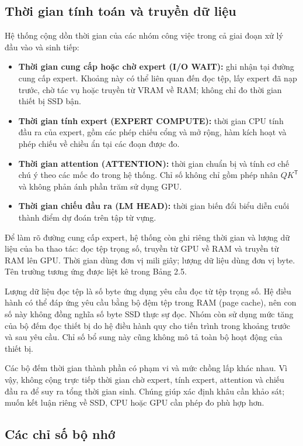 \subsection{Thời gian tính toán và truyền dữ liệu}

Hệ thống cộng dồn thời gian của các nhóm công việc trong cả giai đoạn xử lý đầu vào và sinh tiếp:

\begin{itemize}
\item \textbf{Thời gian cung cấp hoặc chờ expert (I/O WAIT):} ghi nhận tại đường cung cấp expert. Khoảng này có thể liên quan đến đọc tệp, lấy expert đã nạp trước, chờ tác vụ hoặc truyền từ VRAM về RAM; không chỉ đo thời gian thiết bị SSD bận.
\item \textbf{Thời gian tính expert (EXPERT COMPUTE):} thời gian CPU tính đầu ra của expert, gồm các phép chiếu cổng và mở rộng, hàm kích hoạt và phép chiếu về chiều ẩn tại các đoạn được đo.
\item \textbf{Thời gian attention (ATTENTION):} thời gian chuẩn bị và tính cơ chế chú ý theo các mốc đo trong hệ thống. Chỉ số không chỉ gồm phép nhân $QK^\mathsf{T}$ và không phản ánh phần trăm sử dụng GPU.
\item \textbf{Thời gian chiếu đầu ra (LM HEAD):} thời gian biến đổi biểu diễn cuối thành điểm dự đoán trên tập từ vựng.
\end{itemize}

Để làm rõ đường cung cấp expert, hệ thống còn ghi riêng thời gian và lượng dữ liệu của ba thao tác: đọc tệp trọng số, truyền từ GPU về RAM và truyền từ RAM lên GPU. Thời gian dùng đơn vị mili giây; lượng dữ liệu dùng đơn vị byte. Tên trường tương ứng được liệt kê trong Bảng 2.5.

Lượng dữ liệu đọc tệp là số byte ứng dụng yêu cầu đọc từ tệp trọng số. Hệ điều hành có thể đáp ứng yêu cầu bằng bộ đệm tệp trong RAM (page cache), nên con số này không đồng nghĩa số byte SSD thực sự đọc. Nhóm còn sử dụng mức tăng của bộ đếm đọc thiết bị do hệ điều hành quy cho tiến trình trong khoảng trước và sau yêu cầu. Chỉ số bổ sung này cũng không mô tả toàn bộ hoạt động của thiết bị.

Các bộ đếm thời gian thành phần có phạm vi và mức chồng lấp khác nhau. Vì vậy, không cộng trực tiếp thời gian chờ expert, tính expert, attention và chiếu đầu ra để suy ra tổng thời gian sinh. Chúng giúp xác định khâu cần khảo sát; muốn kết luận riêng về SSD, CPU hoặc GPU cần phép đo phù hợp hơn.

\subsection{Các chỉ số bộ nhớ}

